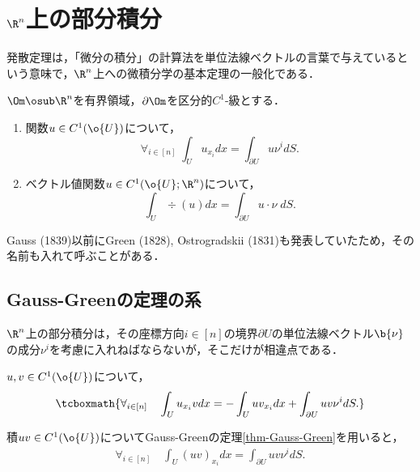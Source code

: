\documentclass[uplatex,dvipdfmx]{jsreport}
\begin{document}
\section{$\R^n$上の部分積分}

\begin{tcolorbox}[colframe=ForestGreen, colback=ForestGreen!10!white,breakable,colbacktitle=ForestGreen!40!white,coltitle=black,fonttitle=\bfseries\sffamily,
    title=]
    発散定理は，「微分の積分」の計算法を単位法線ベクトルの言葉で与えているという意味で，$\R^n$上への微積分学の基本定理の一般化である．
\end{tcolorbox}

\begin{theorem}\label{thm-Gauss-Green}
    $\Om\osub\R^n$を有界領域，$\partial\Om$を区分的$C^1$-級とする．
    \begin{enumerate}
        \item 関数$u\in C^1(\o{U})$について，
        \[\forall_{i\in[n]}\;\int_Uu_{x_i}dx=\int_{\partial U}u\nu^idS.\]
        \item ベクトル値関数$u\in C^1(\o{U};\R^n)$について，
        \[\int_U\div (u)dx=\int_{\partial U}u\cdot \nu\;dS.\]
    \end{enumerate}
\end{theorem}
\begin{history}
    Gauss (1839)以前にGreen (1828), Ostrogradskii (1831)も発表していたため，その名前も入れて呼ぶことがある．
\end{history}

\subsection{Gauss-Greenの定理の系}

\begin{tcolorbox}[colframe=ForestGreen, colback=ForestGreen!10!white,breakable,colbacktitle=ForestGreen!40!white,coltitle=black,fonttitle=\bfseries\sffamily,
title=]
    $\R^n$上の部分積分は，その座標方向$i\in[n]$の境界$\partial U$の単位法線ベクトル$\b{\nu}$の成分$\nu^i$を考慮に入れねばならないが，そこだけが相違点である．
\end{tcolorbox}

\begin{corollary}[成分毎の部分積分公式]\label{cor-partial-integral}
    $u,v\in C^1(\o{U})$について，
    \[\tcboxmath{\forall_{i\in[n]}\quad\int_Uu_{x_i}vdx=-\int_Uuv_{x_i}dx+\int_{\partial U}uv\nu^idS.}\]
\end{corollary}
\begin{Proof}
    積$uv\in C^1(\o{U})$についてGauss-Greenの定理\ref{thm-Gauss-Green}を用いると，
    \begin{align*}
        \forall_{i\in[n]}\quad\int_U(uv)_{x_i}dx=\int_{\partial U}uv\nu^idS.
    \end{align*}
\end{Proof}
\end{document}
